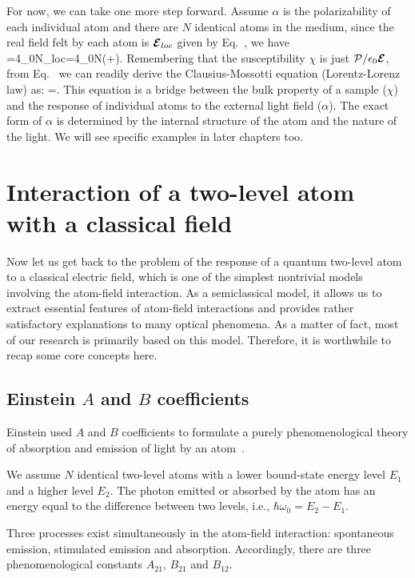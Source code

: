 For now, we can take one more step forward. Assume $\alpha$ is the polarizability of each individual atom and there are $N$ identical atoms in the medium, since the real field felt by each atom is $\cbE_{loc}$ given by Eq.~, we have
\bea
{}=4\pi\epsilon_0N\alpha\cbE_{loc}=4\pi\epsilon_0N\alpha\left(\cbE+\right).
\label{POLARIZATION}
\eea
Remembering that the susceptibility $\chi$ is just $\mathbf{\cal{P}}/\epsilon_0\cbE$, from Eq.~ we can readily derive the Clausius-Mossotti equation (Lorentz-Lorenz law) as:
\bea
\chi=.
\label{LLLAW}
\eea
This equation is a bridge between the bulk property of a sample ($\chi$) and the response of individual atoms to the external light field ($\alpha$). The exact form of $\alpha$ is determined by the internal structure of the atom and the nature of the light. We will see specific examples in later chapters too.


\section{Interaction of a two-level atom with a classical field}

Now let us get back to the problem of the response of a quantum two-level atom to a classical electric field, which is one of the simplest nontrivial models involving the atom-field interaction\cite{quantum_optics}. As a semiclassical model, it allows us to extract essential features of atom-field interactions and provides rather satisfactory explanations to many optical phenomena. As a matter of fact, most of our research is primarily based on this model. Therefore, it is worthwhile to recap some core concepts here.

\subsection{Einstein $A$ and $B$ coefficients}
Einstein used $A$ and $B$ coefficients to formulate a purely phenomenological theory of  absorption and emission of light by an atom~\cite{quantum_optics,1982AmJPh..50..982H}.

We assume $N$ identical two-level atoms with a lower bound-state energy level $E_1$ and a higher level $E_2$. The photon emitted or absorbed by the atom has an energy equal to the difference between two levels, i.e., $\hbar\omega_0=E_2-E_1$.

Three processes exist simultaneously in the atom-field interaction: spontaneous emission, stimulated emission and absorption. Accordingly, there are three phenomenological constants $A_{21}$, $B_{21}$ and $B_{12}$.

